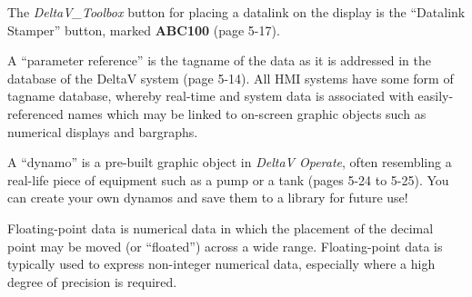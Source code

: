 The {\it DeltaV\_Toolbox} button for placing a datalink on the display is the ``Datalink Stamper'' button, marked {\bf ABC100} (page 5-17). 

\vskip 10pt

A ``parameter reference'' is the tagname of the data as it is addressed in the database of the DeltaV system (page 5-14).  All HMI systems have some form of tagname database, whereby real-time and system data is associated with easily-referenced names which may be linked to on-screen graphic objects such as numerical displays and bargraphs.

\vskip 10pt

A ``dynamo'' is a pre-built graphic object in {\it DeltaV Operate}, often resembling a real-life piece of equipment such as a pump or a tank (pages 5-24 to 5-25).  You can create your own dynamos and save them to a library for future use!

\vskip 10pt

Floating-point data is numerical data in which the placement of the decimal point may be moved (or ``floated'') across a wide range.  Floating-point data is typically used to express non-integer numerical data, especially where a high degree of precision is required.





